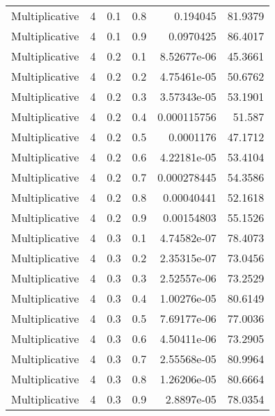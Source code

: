 \documentclass{article}
\begin{document}
\begin{longtable}[H]{lrrrrr}
 Multiplicative &       4 &   0.1 &            0.8 &      0.194045    &         81.9379 \\
 Multiplicative &       4 &   0.1 &            0.9 &      0.0970425   &         86.4017 \\
 Multiplicative &       4 &   0.2 &            0.1 &      8.52677e-06 &         45.3661 \\
 Multiplicative &       4 &   0.2 &            0.2 &      4.75461e-05 &         50.6762 \\
 Multiplicative &       4 &   0.2 &            0.3 &      3.57343e-05 &         53.1901 \\
 Multiplicative &       4 &   0.2 &            0.4 &      0.000115756 &         51.587  \\
 Multiplicative &       4 &   0.2 &            0.5 &      0.0001176   &         47.1712 \\
 Multiplicative &       4 &   0.2 &            0.6 &      4.22181e-05 &         53.4104 \\
 Multiplicative &       4 &   0.2 &            0.7 &      0.000278445 &         54.3586 \\
 Multiplicative &       4 &   0.2 &            0.8 &      0.00040441  &         52.1618 \\
 Multiplicative &       4 &   0.2 &            0.9 &      0.00154803  &         55.1526 \\
 Multiplicative &       4 &   0.3 &            0.1 &      4.74582e-07 &         78.4073 \\
 Multiplicative &       4 &   0.3 &            0.2 &      2.35315e-07 &         73.0456 \\
 Multiplicative &       4 &   0.3 &            0.3 &      2.52557e-06 &         73.2529 \\
 Multiplicative &       4 &   0.3 &            0.4 &      1.00276e-05 &         80.6149 \\
 Multiplicative &       4 &   0.3 &            0.5 &      7.69177e-06 &         77.0036 \\
 Multiplicative &       4 &   0.3 &            0.6 &      4.50411e-06 &         73.2905 \\
 Multiplicative &       4 &   0.3 &            0.7 &      2.55568e-05 &         80.9964 \\
 Multiplicative &       4 &   0.3 &            0.8 &      1.26206e-05 &         80.6664 \\
 Multiplicative &       4 &   0.3 &            0.9 &      2.8897e-05  &         78.0354 \\

\end{longtable}
\end{document}
